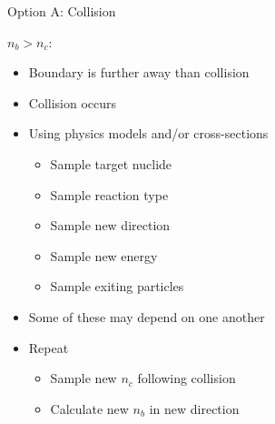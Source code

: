 \documentclass[xcolor=x11names,compress,handout]{beamer}
\renewcommand{\(}{\begin{columns}}
\renewcommand{\)}{\end{columns}}
\newcommand{\<}[1]{\begin{column}{#1}}
\renewcommand{\>}{\end{column}}
\begin{document}
\begin{frame}{Option A: Collision}

  \underline{$n_b > n_c$}:
  \begin{itemize}
    \item Boundary is further away than collision
    \item \alert{Collision occurs}
  \end{itemize}
    \vspace*{0.5 em}
  \pause

\begin{itemize}
  \item Using physics models and/or cross-sections
  \begin{itemize}
    \item Sample target nuclide
    \item Sample reaction type
    \item Sample new direction 
    \item Sample new energy 
    \item Sample exiting particles 
  \end{itemize}
  \item Some of these may depend on one another
  \vspace*{0.5 em}
  \pause
  \item Repeat
  \begin{itemize}
    \item Sample new $n_c$ following collision
    \item Calculate new $n_b$ in new direction
  \end{itemize}
\end{itemize}


\end{frame}
\end{document}
